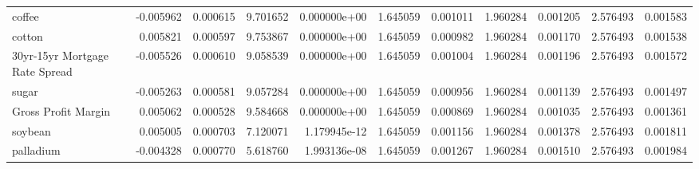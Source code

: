 \documentclass[12pt,a4paper,english]{article}
\begin{document}
{{\begin{tabular}{@{}lrrrrrrrrrr@{}}
			coffee                         & -0.005962                & 0.000615                    & 9.701652                  & 0.000000e+00                             & 1.645059                      & 0.001011                      & 1.960284                     & 0.001205                     & 2.576493                     & 0.001583                     \\
			cotton                         & 0.005821                 & 0.000597                    & 9.753867                  & 0.000000e+00                             & 1.645059                      & 0.000982                      & 1.960284                     & 0.001170                     & 2.576493                     & 0.001538                     \\
			30yr-15yr Mortgage Rate Spread & -0.005526                & 0.000610                    & 9.058539                  & 0.000000e+00                             & 1.645059                      & 0.001004                      & 1.960284                     & 0.001196                     & 2.576493                     & 0.001572                     \\
			sugar                          & -0.005263                & 0.000581                    & 9.057284                  & 0.000000e+00                             & 1.645059                      & 0.000956                      & 1.960284                     & 0.001139                     & 2.576493                     & 0.001497                     \\
			Gross Profit Margin            & 0.005062                 & 0.000528                    & 9.584668                  & 0.000000e+00                             & 1.645059                      & 0.000869                      & 1.960284                     & 0.001035                     & 2.576493                     & 0.001361                     \\
			soybean                        & 0.005005                 & 0.000703                    & 7.120071                  & 1.179945e-12                             & 1.645059                      & 0.001156                      & 1.960284                     & 0.001378                     & 2.576493                     & 0.001811                     \\
			palladium                      & -0.004328                & 0.000770                    & 5.618760                  & 1.993136e-08                             & 1.645059                      & 0.001267                      & 1.960284                     & 0.001510                     & 2.576493                     & 0.001984                     \\

\end{tabular}}}
\end{document}
